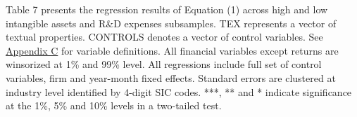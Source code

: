 \begin{table}
\begin{footnotesize}
			\noindent Table 7 presents the regression results of Equation (1) across high and low intangible assets and R\&D expenses subsamples. TEX represents a vector of textual properties. CONTROLS denotes a vector of control variables. See \hyperref[appc]{Appendix C} for variable definitions. All financial variables except returns are winsorized at 1\% and 99\% level. All regressions include full set of control variables, firm and year-month fixed effects. Standard errors are clustered at industry level identified by 4-digit SIC codes. ***, ** and * indicate significance at the 1\%, 5\% and 10\% levels in a two-tailed test.
		\end{footnotesize}
\end{table}%
